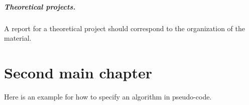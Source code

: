 \documentclass[a4paper,twoside,openright,11pt]{report}
\begin{document}
\paragraph{Theoretical projects.}

A report for a theoretical project should correspond to the organization of
the material.


\chapter{Second main chapter}

Here is an example for how to specify an algorithm in pseudo-code.

\newcommand{\str}[1]{\textsc{#1}}
\newcommand{\var}[1]{\textit{#1}}
\newcommand{\op}[1]{\textsl{#1}}
\def \ifempty#1{\def\temp{#1} \ifx\temp\empty }
\newcommand{\msg}[2]{\ensuremath{\ifempty{#2} [\str{#1}] \else [\str{#1}, {#2}] \fi}}
\newcommand{\tup}[1]{\ensuremath{\langle #1 \rangle}}
\newcommand{\nil}{\ensuremath{\bot}}
\newcommand{\false}{\textsc{false}\xspace}
\newcommand{\true}{\textsc{true}\xspace}

\newcommand\lastts{\var{lastts}\xspace}
\newcommand\nextts{\var{nextts}\xspace}
\newcommand\trusted{\var{trusted}\xspace}
\newcommand\newepoch{\var{newepoch}\xspace}
\newcommand\leader{\var{leader}\xspace}
\newcommand\ts{\var{ts}\xspace}
\newcommand{\CK}{\ensuremath{\mathcal{K}}\xspace}
\newcommand{\CP}{\ensuremath{\mathcal{P}}\xspace}
\newcommand{\CQ}{\ensuremath{\mathcal{Q}}\xspace}
\end{document}
